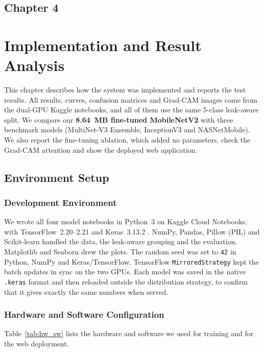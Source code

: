 \begin{center}
    \section*{\fontsize{20}{20}\selectfont Chapter 4}
\end{center}
\vspace{10mm}

\section{Implementation and Result Analysis}

This chapter describes how the system was implemented and reports the test results. All results, curves, confusion matrices and Grad-CAM images come from the dual-GPU Kaggle notebooks, and all of them use the same 5-class leak-aware split. We compare our \textbf{8.64~MB fine-tuned MobileNetV2} with three benchmark models (MultiNet-V3 Ensemble, InceptionV3 and NASNetMobile). We also report the fine-tuning ablation, which added no parameters, check the Grad-CAM attention and show the deployed web application.

\subsection{Environment Setup}

\subsubsection{Development Environment}
We wrote all four model notebooks in Python~3 on Kaggle Cloud Notebooks, with TensorFlow~2.20--2.21 and Keras~3.13.2 \cite{abadi2016tensorflow}. NumPy, Pandas, Pillow (PIL) and Scikit-learn handled the data, the leak-aware grouping and the evaluation. Matplotlib and Seaborn drew the plots. The random seed was set to \texttt{42} in Python, NumPy and Keras/TensorFlow. TensorFlow \texttt{MirroredStrategy} kept the batch updates in sync on the two GPUs. Each model was saved in the native \texttt{.keras} format and then reloaded outside the distribution strategy, to confirm that it gives exactly the same numbers when served.

\subsubsection{Hardware and Software Configuration}
Table~\ref{tab:hw_sw} lists the hardware and software we used for training and for the web deployment.

